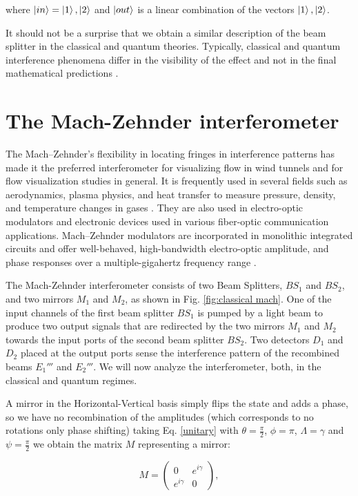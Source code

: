 \documentclass[12pt]{book}
\newcommand\blankpage{
    \null
    \thispagestyle{empty}
    \addtocounter{page}{0}
    \newpage
    }
\begin{document}
where $\ket{in}=\ket{1},\ket{2}$ and $\ket{out}$ is a linear combination of the vectors $\ket{1},\ket{2}$.

 It should not be a surprise that we obtain a similar description of the beam splitter in the classical and quantum theories. Typically, classical and quantum interference phenomena differ in the visibility of the effect and not in the final mathematical predictions \cite{leonhardt}.

\pagebreak
\blankpage
\chapter{The Mach-Zehnder interferometer }


 The Mach–Zehnder's flexibility in locating fringes in interference patterns has made it the preferred interferometer for visualizing flow in wind tunnels \cite{10} and for flow visualization studies in general. It is frequently used in several fields such as aerodynamics, plasma physics, and heat transfer to measure pressure, density, and temperature changes in gases \cite{11}. They are also used in electro-optic modulators \cite{ackerman} and electronic devices used in various fiber-optic communication applications. Mach–Zehnder modulators are incorporated in monolithic integrated circuits and offer well-behaved, high-bandwidth electro-optic amplitude, and phase responses over a multiple-gigahertz frequency range \cite{studenkov,capmany}.

The Mach-Zehnder interferometer consists of two Beam Splitters, $BS_{1}$ and $BS_{2}$, and two mirrors $M_{1}$ and $M_{2}$, as shown in Fig. \ref{fig:classical mach}. One of the input channels of the first beam splitter $BS_{1}$ is pumped by a light beam to produce two output signals that are redirected by the two mirrors $M_{1}$ and $M_{2}$ towards the input ports of the second beam splitter $BS_{2}$.  Two detectors $D_{1}$ and $D_{2}$ placed at the output ports sense the interference pattern of the recombined beams $E_{1}'''$ and $E_{2}'''$. We will now analyze the interferometer, both, in the classical and quantum regimes.


 A mirror in the Horizontal-Vertical basis simply flips the state and adds a phase, so we have no recombination of the amplitudes (which corresponds to no rotations only phase shifting) taking Eq. \ref{unitary} with $\theta=\frac{\pi}{2}$, $\phi=\pi$, $\Lambda=\gamma$ and $\psi= \frac{\pi}{2} $ we obtain the matrix $M$ representing a mirror:

 
\begin{equation}
M=\begin{pmatrix} 0& e^{i\gamma}  \\ e^{i\gamma} & 0 \end{pmatrix}, \label{mirror}
\end{equation}
\end{document}
